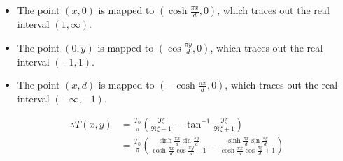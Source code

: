 \begin{enumerate}[wide, labelindent = 0pt, label = (\alph*)]
\begin{itemize}
    \item The point $(x, 0)$ is mapped to $(\cosh \frac{\pi x}{d}, 0)$,
    which traces out the real interval $(1, \infty)$.

    \item The point $(0, y)$ is mapped to $(\cos \frac{\pi y}{d}, 0)$,
    which traces out the real interval $(-1, 1)$.

    \item The point $(x, d)$ is mapped to $(-\cosh \frac{\pi x}{d}, 0)$,
    which traces out the real interval $(-\infty, -1)$.

\end{itemize}
\begin{align*}
    \therefore T(x, y)
    &= \frac{T_0}{\pi} \left(
        \frac{\Im\zeta}{\Re\zeta - 1} - \tan^{-1} \frac{\Im\zeta}{\Re\zeta + 1}
    \right) \\
    &= \frac{T_0}{\pi} \left(
        \frac{\sinh\frac{\pi x}{d}\sin\frac{\pi y}{d}}{\cosh\frac{\pi x}{d}\cos\frac{\pi y}{d}-1}
        - \frac{\sinh\frac{\pi x}{d}\sin\frac{\pi y}{d}}{\cosh\frac{\pi x}{d}\cos\frac{\pi y}{d}+1}
    \right)
\end{align*}

\end{enumerate}
